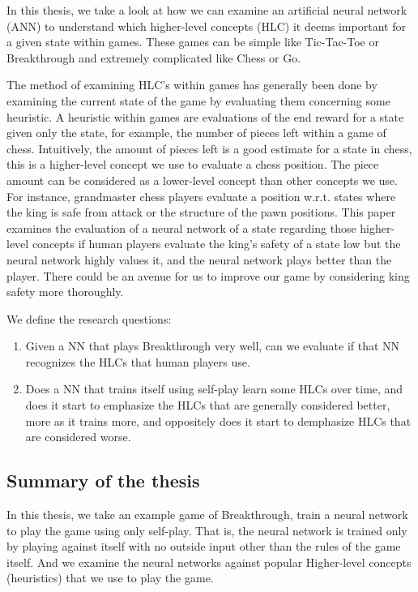 In this thesis, we take a look at how we can examine an artificial neural network (ANN)
to understand which higher-level concepts (HLC) it deems important for a given state
within games. These games can be simple like Tic-Tac-Toe or Breakthrough and extremely
complicated like Chess or Go.

The method of examining HLC's within games has generally been done by examining the
current state of the game by evaluating them concerning some heuristic. A heuristic within games are evaluations of the end reward for a state given only the state, for example,
the number of pieces left within a game of chess. Intuitively, the amount of pieces
left is a good estimate for a state in chess, this is a higher-level concept we
use to evaluate a chess position. The piece amount can be considered as a lower-level concept
than other concepts we use. For instance, grandmaster chess players evaluate a position w.r.t. states
where the king is safe from attack or the structure of the pawn positions.
This paper examines the evaluation of a neural network of a state regarding those higher-level concepts if human players evaluate the king's safety of a state
low but the neural network highly values it, and the neural network plays better
than the player. There could be an avenue for us to improve our game by considering king safety more thoroughly.

We define the research questions:

\begin{enumerate}
  \item Given a NN that plays Breakthrough very well, can we evaluate if that NN recognizes the
        HLCs that human players use.
  \item Does a NN that trains itself using self-play learn some HLCs over time, and does it start to emphasize
        the HLCs that are generally considered better, more as it trains more, and oppositely does it start to
        demphasize HLCs that are considered worse.
\end{enumerate}

\subsection{Summary of the thesis}

In this thesis, we take an example game of Breakthrough, train a neural network to play the game using only self-play. That is, the neural network is trained only by playing against itself with no outside input other than the rules of the game itself. And we examine the neural networks against popular Higher-level concepts (heuristics) that we use to play the game.
